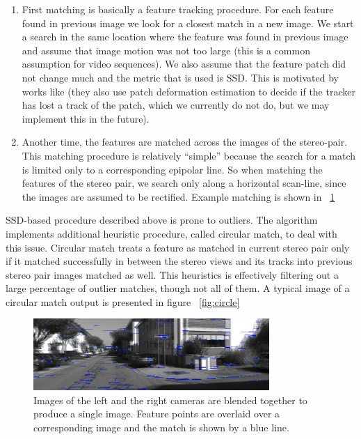 \documentclass[10pt]{article}         %
\begin{document}
\begin{enumerate}
\item First matching is basically a feature tracking procedure.  For each feature found in previous image we look for a closest match in a new image.  We start a search in the same location where the feature was found in previous image and assume that image motion was not too large (this is a common assumption for video sequences).  We also assume that the feature patch did not change much and the metric that is used is SSD.  This is motivated by works like \cite{Shi94goodfeatures} (they also use patch deformation estimation to decide if the tracker has lost a track of the patch, which we currently do not do, but we may implement this in the future).
\item Another time, the features are matched across the images of the stereo-pair.  This matching procedure is relatively ``simple'' because the search for a match is limited only to a corresponding epipolar line. So when matching the features of the stereo pair, we search only along a horizontal scan-line, since the images are assumed to be rectified. Example matching is shown in ~\ref{fig:stereo_match}
\end{enumerate}

SSD-based procedure described above is prone to outliers. The algorithm implements additional heuristic procedure, called circular match, to deal with this issue.  Circular match treats a feature as matched in current stereo pair only if it matched successfully in between the stereo views and its tracks into previous stereo pair images matched as well.  This heuristics is effectively filtering out a large percentage of outlier matches, though not all of them. A typical image of a circular match output is presented in figure ~\ref{fig:circle}
\begin{figure}[h]
    \centering
    \includegraphics[width=0.8\textwidth]{blend}
    \caption{Images of the left and the right cameras are blended together to produce a single image.  Feature points are overlaid over a corresponding image and the match is shown by a blue line.}
    \label{fig:stereo_match}
\end{figure}
\end{document}
